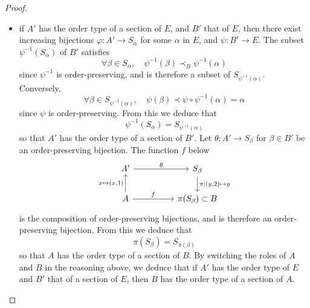 \documentclass[11pt,a4paper,twoside]{article}
\theoremstyle{definition}
\begin{document}
\begin{proof}
\begin{enumerate}[(a)]
\begin{itemize}
      \item if $A'$ has the order type of a section of $E$, and $B'$ that of $E$, then there exist increasing bijections
        $\varphi : A' \to S_\alpha$ for some $\alpha$ in $E$, and $\psi : B' \to E$. The subset $\psi^{-1} ( S_\alpha )$ of $B'$
        satisfies
        \begin{equation*}
          \forall \beta \in S_\alpha, \quad \psi^{-1} ( \beta ) \prec_B \psi^{-1} ( \alpha )
        \end{equation*}
        since $\psi^{-1}$ is order-preserving, and is therefore a subset of $S_{ \psi^{-1} ( \alpha ) }$. Conversely,
        \begin{equation*}
          \forall \beta \in S_{\psi^{-1} ( \alpha )}, \quad \psi ( \beta ) \prec \psi \circ \psi^{-1} ( \alpha ) = \alpha
        \end{equation*}
        since $\psi$ is order-preserving. From this we deduce that
        \begin{equation*}
          \psi^{-1} ( S_\alpha ) = S_{\psi^{-1} ( \alpha )}
        \end{equation*}
        so that $A'$ has the order type of a section of $B'$. Let $\theta : A' \to S_\beta$ for $\beta \in B'$ be an
        order-preserving bijection. The function $f$ below
        \begin{equation*}
          \begin{tikzcd}[column sep = huge]
            A' \arrow{r}{\theta}
            & S_\beta \arrow{d}{\pi : ( y, 2 ) \mapsto y} \\
            A \arrow{r}{f}
              \arrow{u}{x \mapsto ( x, 1 )}
            & \pi ( S_\beta ) \subset B
          \end{tikzcd}
        \end{equation*}
        is the composition of order-preserving bijections, and is therefore an order-preserving bijection. From this
        we deduce that
        \begin{equation*}
          \pi ( S_\beta ) = S_{\pi ( \beta )}
        \end{equation*}
        so that $A$ has the order type of a section of $B$. By switching the roles of $A$ and $B$ in the reasoning above,
        we deduce that if $A'$ has the order type of $E$ and $B'$ that of a section of $E$, then $B$ has the order type
        of a section of $A$.


\end{itemize}
\end{enumerate}
\end{proof}
\end{document}

